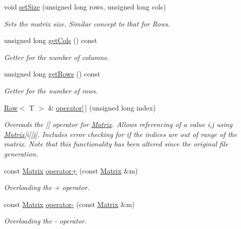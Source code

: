 \begin{DoxyCompactItemize}
\item 
void \hyperlink{class_matrix_aa393296d4132d7aafc4e236ddfe59f06}{set\+Size} (unsigned long rows, unsigned long cols)
\begin{DoxyCompactList}\small\item\em Sets the matrix size. Similar concept to that for Rows. \end{DoxyCompactList}\item 
unsigned long \hyperlink{class_matrix_a9b4ce445c65dcea66c66dda875cc39d8}{get\+Cols} () const 
\begin{DoxyCompactList}\small\item\em Getter for the number of columns. \end{DoxyCompactList}\item 
unsigned long \hyperlink{class_matrix_a442879db6473eeab202928dc47992206}{get\+Rows} () const 
\begin{DoxyCompactList}\small\item\em Getter for the number of rows. \end{DoxyCompactList}\item 
\hyperlink{class_row}{Row}$<$ T $>$ \& \hyperlink{class_matrix_ae7e14b4bd8bb570260a4e578e4a601b7}{operator\mbox{[}$\,$\mbox{]}} (unsigned long index)
\begin{DoxyCompactList}\small\item\em Overoads the \mbox{[}\mbox{]} operator for \hyperlink{class_matrix}{Matrix}. Allows referencing of a value i,j using \hyperlink{class_matrix}{Matrix}\mbox{[}i\mbox{]}\mbox{[}j\mbox{]}. Includes error checking for if the indices are out of range of the matrix. Note that this functionality has been altered since the original file generation. \end{DoxyCompactList}\item 
const \hyperlink{class_matrix}{Matrix} \hyperlink{class_matrix_a311f3649e41cb4a3155f3f71a65829cb}{operator+} (const \hyperlink{class_matrix}{Matrix} \&m)
\begin{DoxyCompactList}\small\item\em Overloading the + operator. \end{DoxyCompactList}\item 
const \hyperlink{class_matrix}{Matrix} \hyperlink{class_matrix_a08e75978ea8288083ef36f53b4ac115d}{operator-\/} (const \hyperlink{class_matrix}{Matrix} \&m)
\begin{DoxyCompactList}\small\item\em Overloading the -\/ operator. \end{DoxyCompactList}\item 

\end{DoxyCompactItemize}

